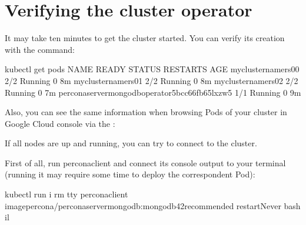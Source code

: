 \documentclass[letterpaper,10pt,english]{sphinxmanual}
\begin{document}
\section{Verifying the cluster operator}
\label{\detokenize{gke:verifying-the-cluster-operator}}
It may take ten minutes to get the cluster started. You  can verify its creation with the  command:

\begin{sphinxVerbatim}[commandchars=\\\{\}]
\PYGZdl{} kubectl get pods
NAME                                                      READY   STATUS    RESTARTS   AGE
my\PYGZhy{}cluster\PYGZhy{}name\PYGZhy{}rs0\PYGZhy{}0                                     2/2     Running   0          8m
my\PYGZhy{}cluster\PYGZhy{}name\PYGZhy{}rs0\PYGZhy{}1                                     2/2     Running   0          8m
my\PYGZhy{}cluster\PYGZhy{}name\PYGZhy{}rs0\PYGZhy{}2                                     2/2     Running   0          7m
percona\PYGZhy{}server\PYGZhy{}mongodb\PYGZhy{}operator\PYGZhy{}5bcc66fb65\PYGZhy{}lxzw5          1/1     Running   0          9m
\end{sphinxVerbatim}

Also, you can see the same information when browsing Pods of your cluster in Google Cloud console via the :


If all nodes are up and running, you can try to connect to the cluster.

First of all, run percona\sphinxhyphen{}client and connect its console output to your
terminal (running it may require some time to deploy the correspondent Pod):

\begin{sphinxVerbatim}[commandchars=\\\{\}]
kubectl run \PYGZhy{}i \PYGZhy{}\PYGZhy{}rm \PYGZhy{}\PYGZhy{}tty percona\PYGZhy{}client \PYGZhy{}\PYGZhy{}imagepercona/percona\PYGZhy{}server\PYGZhy{}mongodb:mongodb42recommended \PYGZhy{}\PYGZhy{}restartNever \PYGZhy{}\PYGZhy{} bash \PYGZhy{}il
\end{sphinxVerbatim}
\end{document}
